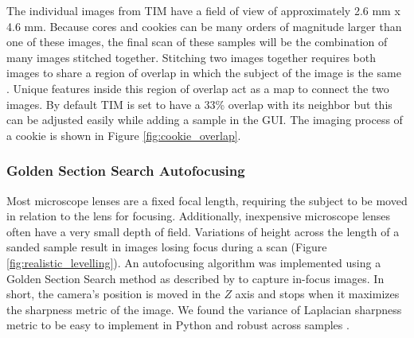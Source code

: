 \documentclass[a4paper,12pt]{article}
\newcommand{\R}[1]{\label{#1}\linelabel{#1}}
\begin{document}
The individual images from TIM have a field of view of approximately 2.6 mm x 4.6 mm. Because cores and cookies can be many orders of magnitude larger than one of these images, the final scan of these samples will be the combination of many images stitched together.
Stitching two images together requires both images to share a region of overlap in which the subject of the image is the same \citep{mohammadi_comparative_2024}.
Unique features inside this region of overlap act as a map to connect the two images.
By default TIM is set to have a 33\% overlap with its neighbor but this can be adjusted easily while adding a sample in the GUI. The imaging process of a cookie is shown in Figure \ref{fig:cookie_overlap}.


\subsubsection{Golden Section Search Autofocusing}

Most microscope lenses are a fixed focal length, requiring the subject to be moved in relation to the lens for focusing. Additionally, inexpensive microscope lenses often have a very small depth of field. 
Variations of height across the length of a sanded sample result in images losing focus during a scan (Figure \ref{fig:realistic_levelling}). 
An autofocusing algorithm was implemented using a Golden Section Search method as described by \citet{gu_region_2015} to capture in-focus images.\R{line_change_3} In short, the camera's position is moved in the $Z$ axis and stops when it maximizes the sharpness metric of the image. 
We found the variance of Laplacian sharpness metric to be easy to implement in Python and robust across samples \citep{pech-pacheco_diatom_2000}. 
\end{document}
